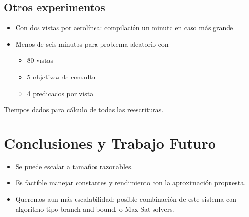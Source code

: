 \documentclass{beamer}
\begin{document}
\subsection{Otros experimentos}
\frame
{
\begin{itemize}
\item Con dos vistas por aerolínea: compilación un minuto en caso más grande
\item Menos de seis minutos para problema aleatorio con
\begin{itemize}
\item 80 vistas
\item 5 objetivos de consulta
\item 4 predicados por vista
\end{itemize}

\end{itemize}

Tiempos dados para cálculo de todas las reescrituras.
}


\section{Conclusiones y Trabajo Futuro}

\frame
{
\begin{itemize}
\item Se puede escalar a tamaños razonables.
\item Es factible manejar constantes y rendimiento con la aproximación
propuesta.
\item Queremos aun más escalabilidad: posible combinación de este
sistema con algoritmo tipo branch and bound, o Max-Sat solvers.
\end{itemize}
}
\end{document}
